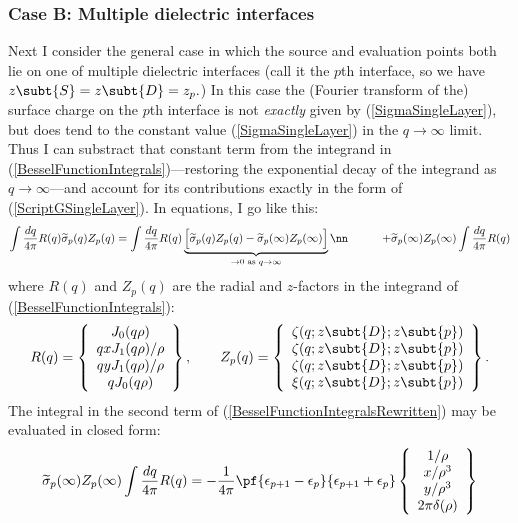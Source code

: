 \documentclass[letterpaper]{article}
\renewcommand{\wt}{\widetilde}
\begin{document}
\subsubsection*{Case B: Multiple dielectric interfaces}

Next I consider the general case in which the source and evaluation points
both lie on one of multiple dielectric interfaces
(call it the $p$th interface, so we have $z\subt{S}=z\subt{D}=z_p.$)
In this case the (Fourier transform of the) surface charge on the $p$th
interface is not \textit{exactly} given by (\ref{SigmaSingleLayer}), but
does tend to the constant value (\ref{SigmaSingleLayer}) in the 
$q\to\infty$ limit. Thus I can substract that constant term from
the integrand in (\ref{BesselFunctionIntegrals})---restoring
the exponential decay of the integrand as $q\to \infty$---and
account for its contributions exactly in the form of 
(\ref{ScriptGSingleLayer}). In equations, I go like this:
\begin{align}
 \int \frac{dq}{4\pi} R(q)
 \wt\sigma_p(q) Z_p(q)
&= 
 \int \frac{dq}{4\pi} R(q)
 \underbrace{
 \Big[\wt \sigma_p(q)Z_p(q) - \wt \sigma_p(\infty)Z_p(\infty)\Big]
            }_{\to 0 \text{ as } q\to \infty}
\nn
&\qquad + \wt\sigma_p(\infty)Z_p(\infty)
  \int \frac{dq}{4\pi} R(q)
\label{BesselFunctionIntegralsRewritten}
\end{align}
where $R(q)$ and $Z_p(q)$ are the radial and $z$-factors in
the integrand of (\ref{BesselFunctionIntegrals}):
$$R(q)=
   \left\{ 
     \begin{array}{c}
        J_0(q\rho)       \\ 
      qxJ_1(q\rho)/\rho  \\
      qyJ_1(q\rho)/\rho  \\
      qJ_0(q\rho)
     \end{array}
   \right\}, 
 \qquad 
  Z_p(q)=
   \left\{ 
     \begin{array}{c}
      \zeta(q;z\subt{D};z\subt{p}) \\
      \zeta(q;z\subt{D};z\subt{p}) \\
      \zeta(q;z\subt{D};z\subt{p}) \\
      \xi(q;z\subt{D};z\subt{p})
     \end{array}
   \right\}.
$$
The integral in the second
term of (\ref{BesselFunctionIntegralsRewritten}) may be
evaluated in closed form:
$$ \wt\sigma_p(\infty) Z_p(\infty)
   \int \frac{dq}{4\pi} R(q)
   = -\frac{1}{4\pi}
      \pf{\epsilon_{p+1} - \epsilon_{p}}{\epsilon_{p+1} + \epsilon_{p}}
      \left\{\begin{array}{c}
          1/\rho   \\
          x/\rho^3 \\
          y/\rho^3 \\
          2\pi\delta(\rho)
      \end{array}\right\}
$$
\end{document}

